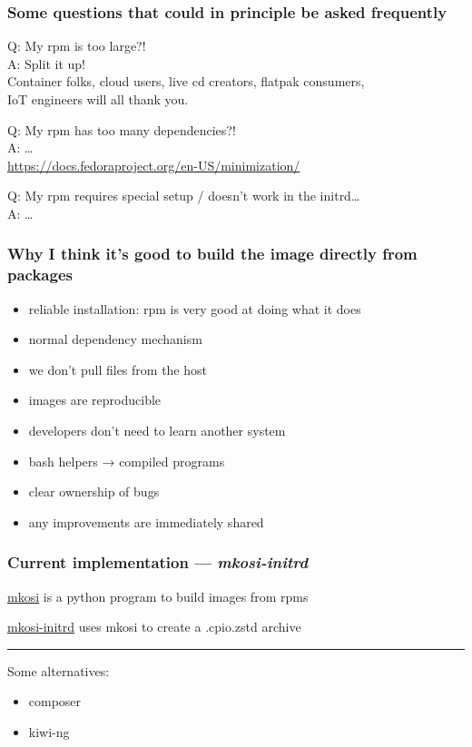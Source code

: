 \documentclass[]{beamer}
\begin{document}
\begin{frame}
  \frametitle{Some questions that could in principle be asked frequently}

  Q: My rpm is too large?!\\\pause
  A: Split it up!\\
  \phantom{A: }Container folks, cloud users, live cd creators, flatpak consumers,\\
  \phantom{A: }IoT engineers will all thank you.

  \bigskip
  \pause

  Q: My rpm has too many dependencies?!\\
  A: … \\\phantom{A: }
     \url{https://docs.fedoraproject.org/en-US/minimization/}

  \bigskip
  \pause

  Q: My rpm requires special setup / doesn't work in the initrd…\\
  A: …\\\phantom{A: }

\end{frame}

\begin{frame}
  \frametitle{Why I think it's good to build the image directly from packages}

  \begin{itemize}
  \item reliable installation: rpm is very good at doing what it does
  \item normal dependency mechanism
  \item we don't pull files from the host
  \item images are reproducible
  \item developers don't need to learn another system
  \item bash helpers → compiled programs
  \item clear ownership of bugs
  \item any improvements are immediately shared
  \end{itemize}
\end{frame}

\begin{frame}
  \frametitle{Current implementation — \emph{mkosi-initrd}}

  \href{https://github.com/systemd/mkosi}{mkosi} is a python program to build images from rpms

  \href{https://github.com/keszybz/mkosi-initrd}{mkosi-initrd} uses mkosi to create a .cpio.zstd archive

  \bigskip

  \hrule

  \bigskip
  \pause

  Some alternatives:
  \begin{itemize}
  \item composer
  \item kiwi-ng
  \end{itemize}
\end{frame}
\end{document}
